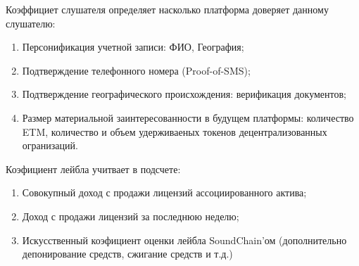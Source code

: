 \documentclass[12pt]{report}
\begin{document}
Коэффициет слушателя определяет насколько платформа доверяет данному слушателю:
\begin{enumerate}
	\item Персонификация учетной записи: ФИО, География;
	\item Подтверждение телефонного номера (Proof-of-SMS);
	\item Подтверждение географического происхождения: верификация документов;
	\item Размер материальной заинтересованности в будущем платформы: количество ETM, количество и объем удерживаеных токенов децентрализованных огранизаций.
\end{enumerate}

Коэфициент лейбла учитвает в подсчете:
\begin{enumerate}
	\item Совокупный доход с продажи лицензий ассоциированного актива;
	\item Доход с продажи лицензий за последнюю неделю;
	\item Искусственный коэфициент оценки лейбла SoundChain'ом (дополнительно депонирование средств, сжигание средств и т.д.)
\end{enumerate}
\begin{equation}
\end{equation}


\end{document}
